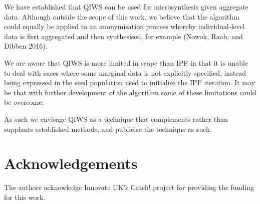 \documentclass{JASSS}
\begin{document}
We have established that QIWS can be used for microsynthesis given
aggregate data. Although outside the scope of this work, we believe that
the algorithm could equally be applied to an anonymisation process
whereby individual-level data is first aggregated and then synthesised,
for example (Nowok, Raab, and Dibben 2016).

We are aware that QIWS is more limited in scope than IPF in that it is
unable to deal with cases where some marginal data is not explicitly
specified, instead being expressed in the seed population used to
initialise the IPF iteration. It may be that with further development of
the algorithm some of these limitations could be overcome.

As such we envisage QIWS as a technique that complements rather than
supplants established methods, and publicise the technique as such.

\section{Acknowledgements}\label{acknowledgements}

The authors acknowledge Innovate UK's Catch! project for providing the
funding for this work.







\endparano
\end{document}
